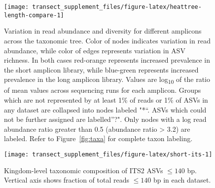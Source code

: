 \documentclass[
]{article}
\begin{document}
\begin{figure}

{\centering \texttt{[image: transect\_supplement\_files/figure-latex/heattree-length-compare-1]} 

}

\caption[Variation in read abundance and diversity for different amplicons across the taxonomic tree]{Variation in read abundance and diversity for different amplicons across the taxonomic tree. Color of nodes indicates variation in read abundance, while color of edges represents variation in ASV richness.
In both cases red-orange represents increased prevalence in the short amplicon library, while blue-green represents increased prevalence in the long amplicon library.
Values are log\textsubscript{10} of the ratio of mean values across sequencing runs for each amplicon.
Groups which are not represented by at least 1\% of reads or 1\% of ASVs in any dataset are collapsed into nodes labeled "*``.
ASVs which could not be further assigned are labelled''?".
Only nodes with a log read abundance ratio greater than 0.5 (abundance ratio \textgreater{} 3.2) are labeled.
Refer to Figure~\ref{fig:taxa} for complete taxon labeling.}\label{fig:heattree-length-compare}
\end{figure}





\begin{figure}

{\centering \texttt{[image: transect\_supplement\_files/figure-latex/short-its-1]} 

}

\caption[Kingdom-level taxonomic composition of ITS2 ASVs \(\le 140\) bp]{Kingdom-level taxonomic composition of ITS2 ASVs \(\le 140\) bp. Vertical axis shows fraction of total reads \(\le 140\) bp in each dataset.}\label{fig:short-its}
\end{figure}
\end{document}
